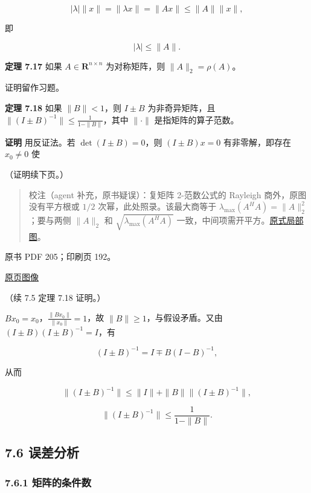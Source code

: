 \documentclass[
  10pt,
  fontset=fandol]{ctexart}
\begin{document}
\[
|\lambda|\|x\|=\|\lambda x\|=\|Ax\|\leqslant\|A\|\|x\|,
\]

即

\[
|\lambda|\leqslant\|A\|.
\]

\textbf{定理 7.17} 如果 \(A\in\mathbf R^{n\times n}\) 为对称矩阵，则
\(\|A\|_2=\rho(A)\)。

证明留作习题。

\textbf{定理 7.18} 如果 \(\|B\|<1\)，则 \(I\pm B\) 为非奇异矩阵，且
\(\|(I\pm B)^{-1}\|\leqslant\frac1{1-\|B\|}\)，其中 \(\|\cdot\|\)
是指矩阵的算子范数。

\textbf{证明} 用反证法。若 \(\det(I\pm B)=0\)，则 \((I\pm B)x=0\)
有非零解，即存在 \(x_0\neq0\) 使

（证明续下页。）

\begin{quote}
校注（agent 补充，原书疑误）：复矩阵 2-范数公式的 Rayleigh
商外，原图没有平方根或 \(1/2\) 次幂，此处照录。该最大商等于
\(\lambda_{\max}(A^HA)=\|A\|_2^2\)；要与两侧 \(\|A\|_2\) 和
\(\sqrt{\lambda_{\max}(A^HA)}\)
一致，中间项需开平方。\href{/Users/xiangjunfeng/Desktop/数值计算专用/numerical-analysis/book/staging/ch07b/assets/204-complex-norm.png}{原式局部图}。
\end{quote}

\clearpage

原书 PDF 205；印刷页 192。

\href{/Users/xiangjunfeng/Desktop/数值计算专用/numerical-analysis/book/source-images/pdf-205.jpeg}{原页图像}

（续 7.5 定理 7.18 证明。）

\(Bx_0=x_0\)，\(\frac{\|Bx_0\|}{\|x_0\|}=1\)，故
\(\|B\|\geqslant1\)，与假设矛盾。又由 \((I\pm B)(I\pm B)^{-1}=I\)，有

\[
(I\pm B)^{-1}=I\mp B(I-B)^{-1},
\]

从而

\[
\|(I\pm B)^{-1}\|\leqslant\|I\|+\|B\|\|(I\pm B)^{-1}\|,
\]

\[
\|(I\pm B)^{-1}\|\leqslant\frac1{1-\|B\|}.
\]

\subsection{7.6 误差分析}\label{ux8befux5deeux5206ux6790}

\subsubsection{7.6.1
矩阵的条件数}\label{ux77e9ux9635ux7684ux6761ux4ef6ux6570}
\end{document}
